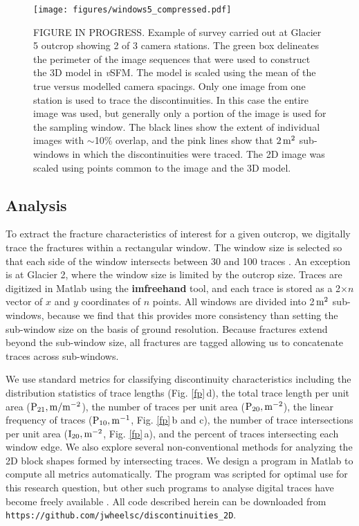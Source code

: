 \documentclass[review]{igs}
\begin{document}
\begin{figure}[H]
  \centering
  \texttt{[image: figures/windows5\_compressed.pdf]}
  \caption[]{FIGURE IN PROGRESS. Example of survey carried out at Glacier 5 outcrop showing 2 of 3 camera stations. The green box delineates the perimeter of the image sequences that were used to construct the 3D model in \emph{v}SFM. The model is scaled using the mean of the true versus modelled camera spacings. Only one image from one station is used to trace the discontinuities. In this case the entire image was used, but generally only a portion of the image is used for the sampling window. The black lines show the extent of individual images with $\sim$10\% overlap, and the pink lines show that $\rm 2\,m^2$ sub-windows in which the discontinuities were traced. The 2D image was scaled using points common to the image and the 3D model.}
\label{pg}
\end{figure}

\subsection{Analysis}

To extract the fracture characteristics of interest for a given outcrop, we digitally trace the fractures within a rectangular window. The window size is selected so that each side of the window intersects between 30 and 100 traces \citep{Priest2012}. An exception is at Glacier 2, where the window size is limited by the outcrop size. Traces are digitized in Matlab using the {\bf imfreehand} tool, and each trace is stored as a 2$\times n$ vector of $x$ and $y$ coordinates of $n$ points. All windows are divided into 2\,$\rm m^{2}$ sub-windows, because we find that this provides more consistency than setting the sub-window size on the basis of ground resolution. Because fractures extend beyond the sub-window size, all fractures are tagged allowing us to concatenate traces across sub-windows. 

We use standard metrics for classifying discontinuity characteristics \citep[e.g.][]{Priest2012} including the distribution statistics of trace lengths (Fig. \ref{fp}\,d), the total trace length per unit area ($\rm{P_{21}, m/m^{-2}}$), the number of traces per unit area ($\rm{P_{20}, m^{-2}}$), the linear frequency of traces ($\rm{P_{10}, m^{-1}}$, Fig. \ref{fp}\,b and c), the number of trace intersections per unit area ($\rm{I_{20}, m^{-2}}$, Fig. \ref{fp}\,a), and the percent of traces intersecting each window edge. We also explore several non-conventional methods for analyzing the 2D block shapes formed by intersecting traces. We design a program in Matlab to compute all metrics automatically. The program was scripted for optimal use for this research question, but other such programs to analyse digital traces have become freely available \citep[e.g.][]{Healy2016}. All code described herein can be downloaded from \verb+https://github.com/jwheelsc/discontinuities_2D+. 
\end{document}
